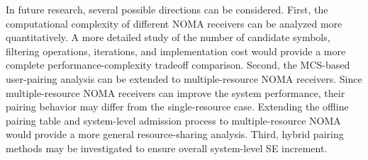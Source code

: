 In future research, several possible directions can be considered. First, the computational complexity of different NOMA receivers can be analyzed more quantitatively. A more detailed study of the number of candidate symbols, filtering operations, iterations, and implementation cost would provide a more complete performance-complexity tradeoff comparison.
Second, the MCS-based user-pairing analysis can be extended to multiple-resource NOMA receivers. 
Since multiple-resource NOMA receivers can improve the system performance, their pairing behavior may differ from the single-resource case. 
Extending the offline pairing table and system-level admission process to multiple-resource NOMA would provide a more general resource-sharing analysis.
Third, hybrid pairing methods may be investigated to ensure overall system-level SE increment. 